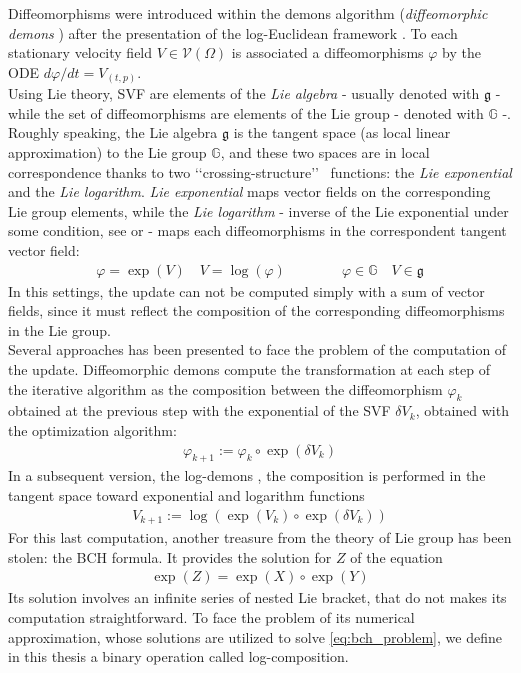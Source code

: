 Diffeomorphisms were introduced within the demons algorithm (\emph{diffeomorphic demons} \cite{vercauteren2006robust}) after the presentation of the log-Euclidean framework \cite{Arsigny:MRM:06}. 
To each stationary velocity field $V \in \mathcal{V}(\Omega)$ is associated a diffeomorphisms $\varphi$ by the ODE $d\varphi /dt = V_{(t,p)} $.\\
Using Lie theory, SVF are elements of the \emph{Lie algebra} - usually denoted with $\mathfrak{g}$ - while the set of diffeomorphisms are elements of the Lie group - denoted with $\mathbb{G}$ -.\\

Roughly speaking, the Lie algebra $\mathfrak{g}$ is the tangent space (as local linear approximation) to the Lie group $\mathbb{G}$, and these two spaces are in local correspondence thanks to two \lq\lq crossing-structure\rq\rq~ functions: the \emph{Lie exponential} and the \emph{Lie logarithm}. \emph{Lie exponential} maps vector fields on the corresponding Lie group elements, while the \emph{Lie logarithm} - inverse of the Lie exponential under some condition, see \cite{do1976differential} or \cite{lee2012introduction} - maps each diffeomorphisms in the correspondent tangent vector field:
\begin{align*}
\varphi = \exp(V)  
\quad
V = \log(\varphi ) 
\qquad \qquad
\varphi  \in \mathbb{G}
\quad
V \in \mathfrak{g}
\end{align*}
In this settings, the update can not be computed simply with a sum of vector fields, since it must reflect the composition of the corresponding diffeomorphisms in the Lie group.\\


Several approaches has been presented to face the problem of the computation of the update. Diffeomorphic demons compute the transformation at each step of the iterative algorithm as the composition between the diffeomorphism $\varphi_{k}$ obtained at the previous step with the exponential of the SVF $\delta V_{k}$, obtained with the optimization algorithm:
\begin{align*}
\varphi_{k + 1} := \varphi_{k}  \circ \exp(\delta V_{k})
\end{align*}
In a subsequent version, the log-demons \cite{vercauteren08}, the composition is performed in the tangent space toward exponential and logarithm functions
\begin{align}\label{eq:bch_problem}
V_{k + 1} := \log( \exp(V_{k})  \circ \exp(\delta V_{k}))
\end{align}
For this last computation, another treasure from the theory of Lie group has been stolen: the BCH formula. It provides the solution for $Z$ of the equation 
\begin{align*}
 \exp(Z) = \exp(X)\circ\exp(Y)
\end{align*}
Its solution involves an infinite series of nested Lie bracket, that do not makes its computation straightforward. 
To face the problem of its numerical approximation, whose solutions are utilized to solve \ref{eq:bch_problem}, we define in this thesis a binary operation called log-composition.


